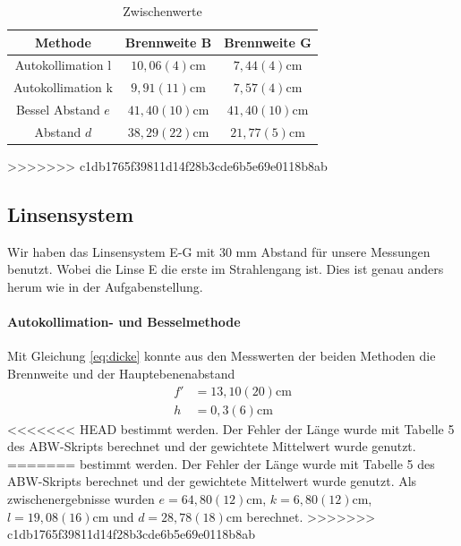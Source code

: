 \documentclass[11pt, a4paper]{article}
\begin{document}
    \begin{table}[h]
        \centering
        \begin{tabular}{c|c|c}
            Methode & Brennweite B & Brennweite G \\ \hline
            Autokollimation l & $10,06(4) \si{\centi\metre}$ & $7,44(4) \si{\centi\metre}$ \\ \hline
            Autokollimation k & $9,91(11) \si{\centi\metre}$ & $7,57(4) \si{\centi\metre}$ \\ \hline
            Bessel Abstand $e$ & $41,40(10) \si{\centi\metre}$ & $41,40(10) \si{\centi\metre}$ \\ \hline
            Abstand $d$ & $38,29(22) \si{\centi\metre}$ & $21,77(5) \si{\centi\metre}$
        \end{tabular}
        \caption{Zwischenwerte }
        \label{tab:zwischen}
    \end{table}
>>>>>>> c1db1765f39811d14f28b3cde6b5e69e0118b8ab

    \subsection{Linsensystem}
    Wir haben das Linsensystem E-G mit $30$ mm Abstand für unsere Messungen benutzt. Wobei die Linse E die erste im Strahlengang ist. Dies ist genau anders herum wie in der Aufgabenstellung.

    \paragraph{Autokollimation- und Besselmethode}
    Mit Gleichung \ref{eq:dicke} konnte aus den Messwerten der beiden Methoden die Brennweite und der Hauptebenenabstand
    \begin{align}
        f' &= 13,10(20) \si{\centi\metre} \\
        h &= 0,3(6) \si{\centi\metre}
    \end{align}
<<<<<<< HEAD
    bestimmt werden. Der Fehler der Länge wurde mit Tabelle 5 des ABW-Skripts \cite{ABW} berechnet und der gewichtete Mittelwert wurde genutzt.
=======
    bestimmt werden. Der Fehler der Länge wurde mit Tabelle 5 des ABW-Skripts \cite{ABW} berechnet und der gewichtete Mittelwert wurde genutzt. Als zwischenergebnisse wurden $e = 64,80(12) \si{\centi\metre}$, $k = 6,80(12) \si{\centi\metre}$, $l = 19,08(16) \si{\centi\metre}$ und $d = 28,78(18) \si{\centi\metre}$ berechnet.
>>>>>>> c1db1765f39811d14f28b3cde6b5e69e0118b8ab
\end{document}
